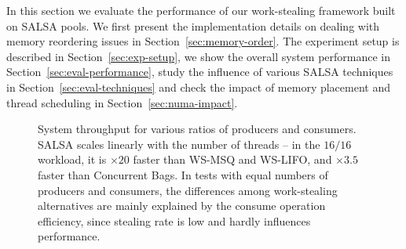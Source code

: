 In this section we evaluate the performance of our work-stealing framework built on SALSA pools. 
We first present the implementation details on dealing with memory reordering issues in Section~\ref{sec:memory-order}. The experiment setup is described in Section~\ref{sec:exp-setup}, we show the overall system performance in Section~\ref{sec:eval-performance}, study the influence of various SALSA techniques in Section~\ref{sec:eval-techniques} and check the impact of memory placement and thread scheduling in Section~\ref{sec:numa-impact}. 

\begin{figure}[tbh]
	\centering
  \vspace{-10pt}
	\caption{\footnotesize{System throughput for various ratios of producers and consumers. SALSA scales linearly with the number of threads -- in the $16/16$ workload, it is $\times20$ faster than WS-MSQ and WS-LIFO, and $\times3.5$ faster than Concurrent Bags. In tests with equal numbers of producers and consumers, the differences among work-stealing alternatives are mainly explained by the consume operation efficiency, since stealing rate is low and hardly influences performance. 
}}
	\vspace{-5pt}
	\label{fig:throughput}
\end{figure}

